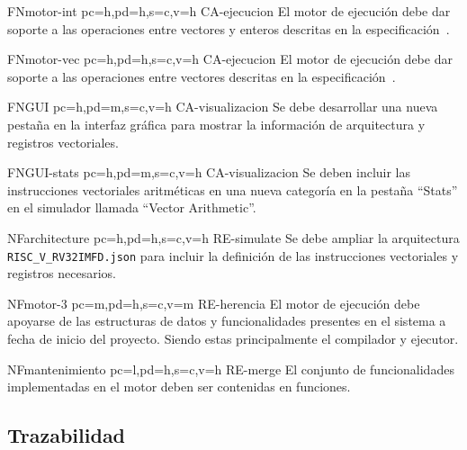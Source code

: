 \begin{softwareReq}{FN}{motor-int}
    {pc=h,pd=h,s=c,v=h}
    {CA-ejecucion}
    El motor de ejecución debe dar soporte a las operaciones entre vectores y enteros descritas en la especificación~\cite{riscv-isa2024}.
\end{softwareReq}

\begin{softwareReq}{FN}{motor-vec}
    {pc=h,pd=h,s=c,v=h}
    {CA-ejecucion}
    El motor de ejecución debe dar soporte a las operaciones entre vectores descritas en la especificación~\cite{riscv-isa2024}.
\end{softwareReq}

\begin{softwareReq}{FN}{GUI}
    {pc=h,pd=m,s=c,v=h}
    {CA-visualizacion}
    Se debe desarrollar una nueva pestaña en la interfaz gráfica para mostrar la información de arquitectura y registros vectoriales.
\end{softwareReq}

\begin{softwareReq}{FN}{GUI-stats}
    {pc=h,pd=m,s=c,v=h}
    {CA-visualizacion}
    Se deben incluir las instrucciones vectoriales aritméticas en una nueva categoría en la pestaña ``Stats'' en el simulador llamada ``Vector Arithmetic''.
\end{softwareReq}

\begin{softwareReq}{NF}{architecture}
    {pc=h,pd=h,s=c,v=h}
    {RE-simulate}
    Se debe ampliar la arquitectura \texttt{RISC\_V\_RV32IMFD.json} para incluir la definición de las instrucciones vectoriales y registros necesarios.
\end{softwareReq}

\begin{softwareReq}{NF}{motor-3}
    {pc=m,pd=h,s=c,v=m}
    {RE-herencia}
    El motor de ejecución debe apoyarse de las estructuras de datos y funcionalidades presentes en el sistema a fecha de inicio del proyecto. Siendo estas principalmente el compilador y ejecutor.
\end{softwareReq}

\begin{softwareReq}{NF}{mantenimiento}
    {pc=l,pd=h,s=c,v=h}
    {RE-merge}
    El conjunto de funcionalidades implementadas en el motor deben ser contenidas en funciones.
\end{softwareReq}


\FloatBarrier

\subsection{Trazabilidad}

